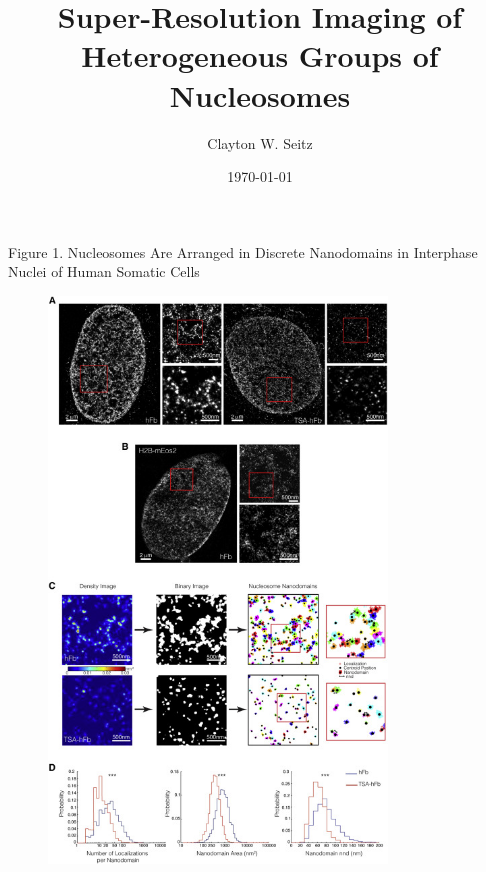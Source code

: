 \documentclass{beamer}			%
\title{Super-Resolution Imaging of Heterogeneous Groups of Nucleosomes}	%
\author{Clayton W. Seitz}								%
\date{\today}									%
\begin{document}
\begin{frame}
  \titlepage
\end{frame}


%


\begin{frame}{Figure 1. Nucleosomes Are Arranged in Discrete Nanodomains in Interphase Nuclei of Human Somatic Cells}
\begin{figure}
\includegraphics[width=9cm]{Figure-1.jpg}
\end{figure}
\end{frame}
\end{document}
